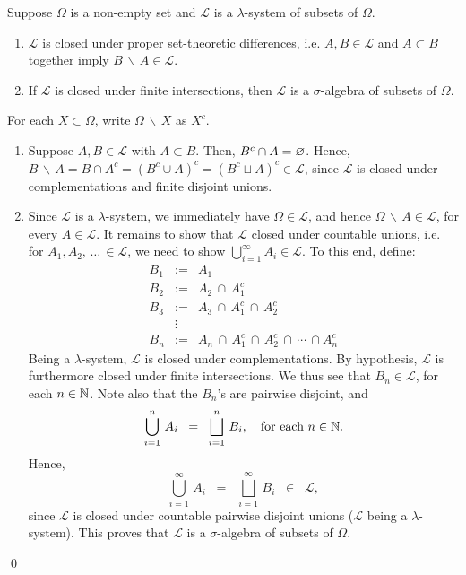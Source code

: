 \begin{theorem}\label{LambdaSystemProperties}
\mbox{}\vskip 0.1cm
\noindent
Suppose $\Omega$ is a non-empty set and $\mathcal{L}$ is a $\lambda$-system of subsets of $\Omega$.
\begin{enumerate}
\item
	$\mathcal{L}$ is closed under proper set-theoretic differences, i.e.
	$A, B \in \mathcal{L}$ and $A \subset B$ together imply $B\,\backslash\,A \in \mathcal{L}$.
\item
	If $\mathcal{L}$ is closed under finite intersections,
	then $\mathcal{L}$ is a $\sigma$-algebra of subsets of $\Omega$.
\end{enumerate}
\end{theorem}
\proof
For each $X \subset \Omega$, write $\Omega\,\backslash\,X$ as $X^{c}$.
\begin{enumerate}
\item
	Suppose $A, B \in \mathcal{L}$ with $A \subset B$.
	Then, $B^{c} \cap A = \varnothing$.
	Hence, $B\,\backslash\,A = B \cap A^{c} = \left(B^{c} \cup A\right)^{c} = \left(B^{c} \sqcup A\right)^{c} \in \mathcal{L}$,
	since $\mathcal{L}$ is closed under complementations and finite disjoint unions.
\item
Since $\mathcal{L}$ is a $\lambda$-system, we immediately have $\Omega \in \mathcal{L}$,
and hence $\Omega\,\backslash\,A \in \mathcal{L}$, for every $A \in \mathcal{L}$.
It remains to show that $\mathcal{L}$ closed under countable unions, i.e.
for $A_{1}, A_{2}, \, \ldots \, \in \mathcal{L}$, we need to show $\bigcup_{i=1}^{\infty}A_{i} \in \mathcal{L}$.
To this end, define:
\begin{eqnarray*}
B_{1} & := & A_{1} \\
B_{2} & := & A_{2} \, \cap \, A_{1}^{c} \\
B_{3} & := & A_{3} \, \cap \, A_{1}^{c} \, \cap \, A_{2}^{c} \\
&\vdots&\\
B_{n} & := & A_{n} \, \cap \, A_{1}^{c} \, \cap \, A_{2}^{c} \, \cap \, \cdots \, \cap A_{n}^{c}
\end{eqnarray*}
Being a $\lambda$-system, $\mathcal{L}$ is closed under complementations.
By hypothesis, $\mathcal{L}$ is furthermore closed under finite intersections.
We thus see that $B_{n} \in \mathcal{L}$, for each $n \in \mathbb{N}$.
Note also that the $B_{n}$'s are pairwise disjoint, and
\begin{equation*}
\bigcup_{i=1}^{n}\,A_{i} \;\; = \;\; \bigsqcup_{i=1}^{n}\,B_{i},
\quad\textnormal{for each $n \in \mathbb{N}$}.
\end{equation*}
Hence,
\begin{equation*}
\bigcup_{i=1}^{\infty}\,A_{i} \;\; = \;\; \bigsqcup_{i=1}^{\infty}\,B_{i} \;\; \in \;\; \mathcal{L},
\end{equation*}
since $\mathcal{L}$ is closed under countable pairwise disjoint unions ($\mathcal{L}$ being a $\lambda$-system).
This proves that $\mathcal{L}$ is a $\sigma$-algebra of subsets of $\Omega$.
\end{enumerate}
\qed

